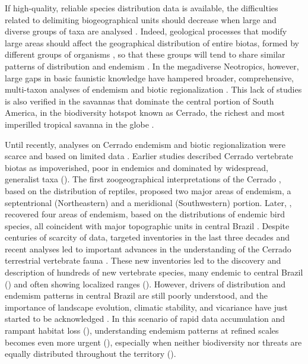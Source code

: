 \documentclass[12pt,openright,oneside,a4paper,english]{abntex2}
\begin{document}
If high-quality, reliable species distribution data is available, the difficulties related to delimiting biogeographical units should decrease when large and diverse groups of taxa are analysed \citep{Nelson1981, KreftJetz2010}. Indeed, geological processes that modify large areas should affect the geographical distribution of entire biotas, formed by different groups of organisms \citep{Wiley1988}, so that these groups will tend to share similar patterns of distribution and endemism \citep{Wiley1988, Hausdorf2002}. In the megadiverse Neotropics, however, large gaps in basic faunistic knowledge have hampered broader, comprehensive, multi-taxon analyses of endemism and biotic regionalization \citep{KreftJetz2010, Holt2013}. This lack of studies is also verified in the savannas that dominate the central portion of South America, in the biodiversity hotspot known as Cerrado, the richest and most imperilled tropical savanna in the globe \citep{Colli2020}.

Until recently, analyses on Cerrado endemism and biotic regionalization were scarce and based on limited data \citep{Colli2020}. Earlier studies described Cerrado vertebrate biotas as impoverished, poor in endemics and dominated by widespread, generalist taxa (\citealp[see][]{Vanzolini1963, Sick1965}). The first zoogeographical interpretations of the Cerrado \citep{Vanzolini1963}, based on the distribution of reptiles, proposed two major areas of endemism, a septentrional (Northeastern) and a meridional (Southwestern) portion. Later, \citet{Silva1997}, recovered four areas of endemism, based on the distributions of endemic bird species, all coincident with major topographic units in central Brazil \citep{Silva1997}. Despite centuries of scarcity of data, targeted inventories in the last three decades and recent analyses led to important advances in the understanding of the Cerrado terrestrial vertebrate fauna \citep{Nogueira2010, Carmignotto2012, Valdujo2012, Azevedo2016}. These new inventories led to the discovery and description of hundreds of new vertebrate species, many endemic to central Brazil (\citealp[see examples in][]{Nogueira2010}) and often showing localized ranges (\citealp[see trends in][]{Gaston1996}). However, drivers of distribution and endemism patterns in central Brazil are still poorly understood, and the importance of landscape evolution, climatic stability, and vicariance have just started to be acknowledged \citep{Silva1997, Lopes2008, Nogueira2011, Werneck2011, Azevedo2016, Carmignotto2022}. In this scenario of rapid data accumulation and rampant habitat loss (\citealp[see][]{Colli2020}), understanding endemism patterns at refined scales becomes even more urgent (\citealp[see][]{Brooks2006}), especially when neither biodiversity nor threats are equally distributed throughout the territory (\citealp[e.g.][]{Azevedo2016, Strassburg2017, Francoso2020}).
\end{document}
